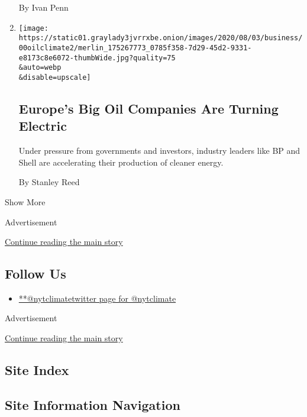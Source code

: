 \begin{enumerate}
  By Ivan Penn
\item
  \href{/2020/08/17/business/energy-environment/oil-companies-europe-electric.html}{}

  \texttt{[image: https://static01.graylady3jvrrxbe.onion/images/2020/08/03/business/00oilclimate2/merlin\_175267773\_0785f358-7d29-45d2-9331-e8173c8e6072-thumbWide.jpg?quality=75\\\&auto=webp\\\&disable=upscale]}

  \hypertarget{europes-big-oil-companies-are-turning-electric}{%
  \subsection{Europe's Big Oil Companies Are Turning
  Electric}\label{europes-big-oil-companies-are-turning-electric}}

  Under pressure from governments and investors, industry leaders like
  BP and Shell are accelerating their production of cleaner energy.

  By Stanley Reed
\end{enumerate}

Show More

Advertisement

\protect\hyperlink{after-mid2}{Continue reading the main story}

\hypertarget{follow-us}{%
\subsection{Follow Us}\label{follow-us}}

\begin{itemize}
\tightlist
\item
  \href{https://twitter.com/nytclimate}{**@nytclimatetwitter page for
  @nytclimate}
\end{itemize}

Advertisement

\protect\hyperlink{after-mktg}{Continue reading the main story}

\hypertarget{site-index}{%
\subsection{Site Index}\label{site-index}}

\hypertarget{site-information-navigation}{%
\subsection{Site Information
Navigation}\label{site-information-navigation}}

